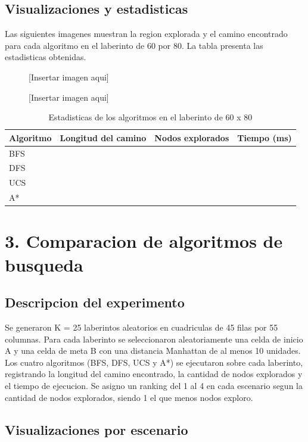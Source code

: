 \documentclass[12pt]{article}
\newcommand{\imgplaceholder}[2]{%
  \begin{figure}[H]
    \centering
    \fbox{\rule{0pt}{#2}\rule{#1}{0pt}}
    \caption{[Insertar imagen aqui]}
  \end{figure}%
}
\begin{document}
\subsection{Visualizaciones y estadisticas}

Las siguientes imagenes muestran la region explorada y el camino encontrado para cada algoritmo en el laberinto de 60 por 80. La tabla presenta las estadisticas obtenidas.

\imgplaceholder{0.9\textwidth}{7cm}

\imgplaceholder{0.9\textwidth}{7cm}

\vspace{8pt}
\begin{table}[H]
\centering
\begin{tabular}{lrrr}
\toprule
Algoritmo & Longitud del camino & Nodos explorados & Tiempo (ms) \\
\midrule
BFS  & & & \\
DFS  & & & \\
UCS  & & & \\
A*   & & & \\
\bottomrule
\end{tabular}
\caption{Estadisticas de los algoritmos en el laberinto de 60 x 80}
\end{table}

\section{3. Comparacion de algoritmos de busqueda}

\subsection{Descripcion del experimento}

Se generaron K = 25 laberintos aleatorios en cuadriculas de 45 filas por 55 columnas. Para cada laberinto se seleccionaron aleatoriamente una celda de inicio A y una celda de meta B con una distancia Manhattan de al menos 10 unidades. Los cuatro algoritmos (BFS, DFS, UCS y A*) se ejecutaron sobre cada laberinto, registrando la longitud del camino encontrado, la cantidad de nodos explorados y el tiempo de ejecucion. Se asigno un ranking del 1 al 4 en cada escenario segun la cantidad de nodos explorados, siendo 1 el que menos nodos exploro.

\subsection{Visualizaciones por escenario}
\end{document}
